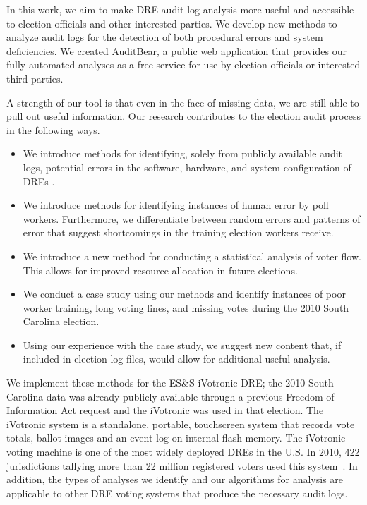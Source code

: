 \documentclass[letterpaper,twocolumn,10pt]{article}
\begin{document}
In this work, we aim to make DRE audit log analysis more useful and accessible
to election officials and other interested parties. We develop new methods to
analyze audit logs for the detection of both procedural errors and system
deficiencies. We created AuditBear, a public web application that provides our 
fully automated analyses as a free service for use by election officials or
interested third parties.  

A strength of our tool is that even in the face of missing data, we are still 
able to pull out useful information. Our research contributes to the election 
audit process in the following ways.

\begin{itemize}
\item We introduce methods for identifying, solely from publicly available audit
  logs, potential errors in the software, hardware, and system configuration of
  DREs .
\item We introduce methods for identifying instances of human error by poll
  workers. Furthermore, we differentiate between random
  errors and patterns of error that suggest shortcomings in the training
  election workers receive.
\item We introduce a new method for conducting a statistical analysis of voter
  flow. This allows for improved resource allocation in future elections.
\item We conduct a case study using our methods and identify instances of poor
  worker training, long voting lines, and missing votes during the 2010 South
  Carolina election.
\item Using our experience with the case study, we suggest new content that, if
  included in election log files, would allow for additional useful analysis.
\end{itemize}

We implement these methods for the ES\&S 
iVotronic DRE; the 2010 South Carolina data was already publicly available 
through a previous Freedom of Information Act request and the iVotronic was 
used in that election. The iVotronic system is a standalone, portable, 
touchscreen system that records vote totals, ballot images and an event log 
on internal flash memory. The iVotronic voting machine is one of the most 
widely deployed DREs in the U.S. In 2010, 422 jurisdictions tallying more 
than 22 million registered voters used this system~\cite{VerVot2010}. In 
addition, the types of analyses we identify and our algorithms for analysis 
are applicable to other DRE voting systems that produce the necessary audit 
logs. 
\end{document}
